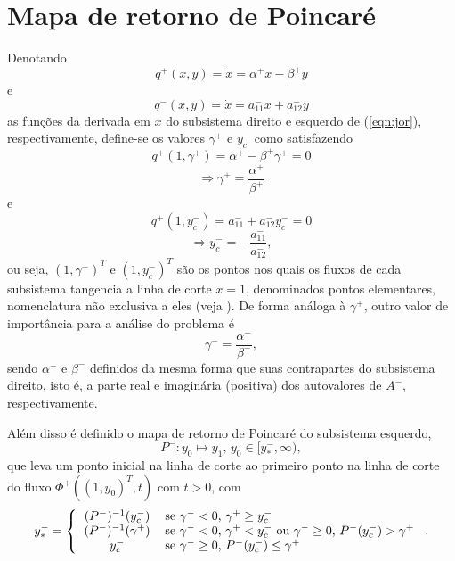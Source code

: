\section{Mapa de retorno de Poincaré}
Denotando
\[
q^+(x, y)=\dot{x}=\alpha^+x − \beta^+y
\]
e
\[
q^-(x, y)=\dot{x}=a^−_{11}x + a^−_{12}y
\]
as funções da derivada em $x$ do subsistema direito e esquerdo de (\ref{eqn:jor}), respectivamente, define-se os valores $\gamma^+$ e $y_c^-$ como satisfazendo
\begin{equation}
\label{eqn:gmm}
q^+(1, \gamma^+)=\alpha^+ − \beta^+\gamma^+=0
\end{equation}
\[
\Rightarrow \gamma^+=\frac{\alpha^+}{\beta^+}
\]
e
\begin{equation}
\label{eqn:yc}
q^+(1, y_c^-)=a^−_{11} + a^−_{12}y_c^-=0
\end{equation}
\[
\Rightarrow y_c^-=-\frac{a^−_{11}}{a^−_{12}},
\]
ou seja, $(1, \gamma^+)^T$ e $(1,  y_c^-)^T$ são os pontos nos quais os fluxos de cada subsistema tangencia a linha de corte $x=1$, denominados pontos elementares, nomenclatura não exclusiva a eles (veja \cite{HAN20102399}). De forma análoga à $\gamma^+$, outro valor de importância para a análise do problema é 
\begin{equation}
\label{gminus}
\gamma^-=\frac{\alpha^-}{\beta^-},
\end{equation}
sendo $\alpha^-$ e $\beta^-$ definidos da mesma forma que suas contrapartes do subsistema direito, isto é, a parte real e imaginária (positiva) dos autovalores de $A^-$, respectivamente. 

Além disso é definido o mapa de retorno de Poincaré do subsistema esquerdo, 
\begin{equation}
\label{left}
P^-:y_0\mapsto y_1\text{, }y_0\in[y_*^-, \infty),
\end{equation}
que leva um ponto inicial na linha de corte ao primeiro ponto na linha de corte do fluxo $\Phi^{+}((1, y_0)^T, t)$ com $t>0$, com
\begin{equation}
\label{yast}
y_*^-=
\left\{
\begin{tabular}{cl}
$(P^-)^{-1}(y_c^-)$&se $\gamma^-<0\text{, }\gamma^+\geq y_c^-$\\
$(P^-)^{-1}(\gamma^+)$&se $\gamma^-<0\text{, }\gamma^+<y_c^-\text{ ou }\gamma^-\geq0\text{, }P^-(y_c^-)>\gamma^+$\\
$y_c^-$&se $\gamma^-\geq0\text{, }P^-(y_c^-)\leq\gamma^+$
\end{tabular}
\right..
\end{equation}

